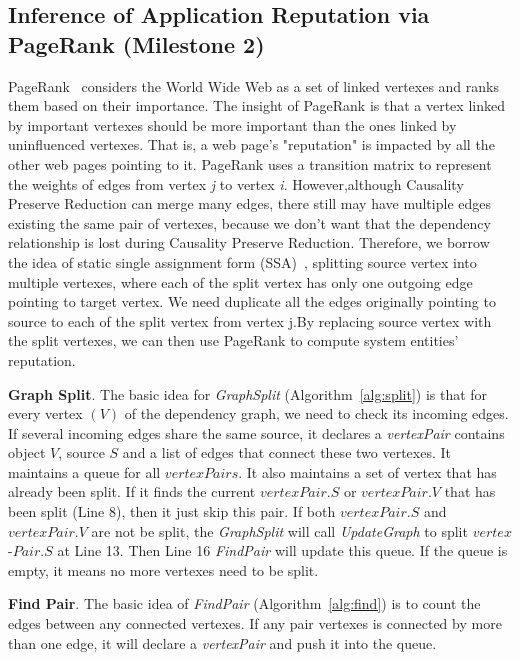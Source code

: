 \subsection{Inference of Application Reputation via\\PageRank (Milestone 2)}

PageRank~\cite{pagerank} considers the World Wide Web as a set of linked vertexes and ranks them based on their importance. The insight of PageRank is that a vertex linked by important vertexes should be more important than the ones linked by uninfluenced vertexes. That is, a web page's "reputation" is impacted by all the other web pages pointing to it. PageRank uses a transition matrix to represent the weights of edges from vertex \textit{j} to vertex \textit{i}. However,although Causality Preserve Reduction can merge many edges, there still may have multiple edges existing the same pair of vertexes, because we don't want that the dependency relationship is lost during Causality Preserve Reduction. Therefore, we borrow the idea of static single assignment form (SSA)~\cite{nielson2004principles}, splitting source vertex  into multiple vertexes, where each of the split vertex has only one outgoing edge pointing to target vertex. We need duplicate all the edges originally pointing to source to each of the split vertex from vertex j.By replacing source vertex with the split vertexes, we can then use PageRank to compute system entities' reputation.

\textbf{Graph Split}.
The basic idea for \emph{GraphSplit} (Algorithm~\ref{alg:split}) is that for every vertex $(V)$ of the dependency graph, we need to check its incoming edges. If several incoming edges share the same source, it declares a \textit{vertexPair} contains object $V$, source $S$ and a list of edges that connect these two vertexes. It maintains a queue for all $vertexPairs$. It also maintains a set of vertex that has already been split. If it finds the current $vertexPair.S$ or $vertexPair.V$ that has been split (Line 8), then it just skip this pair. If both  $vertexPair.S$ and $vertexPair.V$  are not be split, the \emph{GraphSplit} will call \emph{UpdateGraph} to split $vertex$-$Pair.S$ at Line 13. Then Line 16 \emph{FindPair} will update this queue. If the queue is empty, it means no more vertexes need to be split.


\textbf{Find Pair}.
The basic idea of \emph{FindPair} (Algorithm~\ref{alg:find}) is to count the edges between any connected vertexes. If any pair vertexes is connected by more than one edge, it will declare a \textit{vertexPair} and push it into the queue. 

